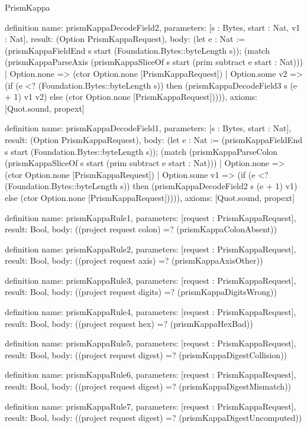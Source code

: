 \begin{lexlean}{PrismKappa}
\begin{semanticmodule}
definition{
  name: prismKappaDecodeField2,
  parameters: [s : Bytes, start : Nat, v1 : Nat],
  result: (Option PrismKappaRequest),
  body: (let e : Nat := (prismKappaFieldEnd s start (Foundation.Bytes::byteLength s)); (match (prismKappaParseAxis (prismKappaSliceOf s start (prim subtract e start : Nat)))
    | Option.none => (ctor Option.none [PrismKappaRequest])
    | Option.some v2 => (if (e <? (Foundation.Bytes::byteLength s)) then (prismKappaDecodeField3 s (e + 1) v1 v2) else (ctor Option.none [PrismKappaRequest])))),
  axioms: [Quot.sound, propext]
}

definition{
  name: prismKappaDecodeField1,
  parameters: [s : Bytes, start : Nat],
  result: (Option PrismKappaRequest),
  body: (let e : Nat := (prismKappaFieldEnd s start (Foundation.Bytes::byteLength s)); (match (prismKappaParseColon (prismKappaSliceOf s start (prim subtract e start : Nat)))
    | Option.none => (ctor Option.none [PrismKappaRequest])
    | Option.some v1 => (if (e <? (Foundation.Bytes::byteLength s)) then (prismKappaDecodeField2 s (e + 1) v1) else (ctor Option.none [PrismKappaRequest])))),
  axioms: [Quot.sound, propext]
}

definition{
  name: prismKappaRule1,
  parameters: [request : PrismKappaRequest],
  result: Bool,
  body: ((project request colon) =? (prismKappaColonAbsent))
}

definition{
  name: prismKappaRule2,
  parameters: [request : PrismKappaRequest],
  result: Bool,
  body: ((project request axis) =? (prismKappaAxisOther))
}

definition{
  name: prismKappaRule3,
  parameters: [request : PrismKappaRequest],
  result: Bool,
  body: ((project request digits) =? (prismKappaDigitsWrong))
}

definition{
  name: prismKappaRule4,
  parameters: [request : PrismKappaRequest],
  result: Bool,
  body: ((project request hex) =? (prismKappaHexBad))
}

definition{
  name: prismKappaRule5,
  parameters: [request : PrismKappaRequest],
  result: Bool,
  body: ((project request digest) =? (prismKappaDigestCollision))
}

definition{
  name: prismKappaRule6,
  parameters: [request : PrismKappaRequest],
  result: Bool,
  body: ((project request digest) =? (prismKappaDigestMismatch))
}

definition{
  name: prismKappaRule7,
  parameters: [request : PrismKappaRequest],
  result: Bool,
  body: ((project request digest) =? (prismKappaDigestUncomputed))
}


\end{semanticmodule}
\end{lexlean}
